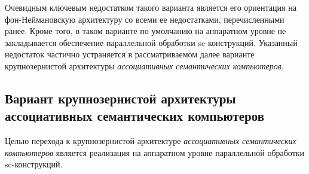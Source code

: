 Очевидным ключевым недостатком такого варианта является его ориентация на фон-Неймановскую архитектуру со всеми ее недостатками, перечисленными ранее. Кроме того, в таком варианте по умолчанию на аппаратном уровне не закладывается обеспечение параллельной обработки sc-конструкций. Указанный недостаток частично устраняется в рассматриваемом далее варианте крупнозернистой архитектуры \textit{ассоциативных семантических компьютеров}.

\subsection{Вариант крупнозернистой архитектуры ассоциативных семантических компьютеров}

Целью перехода к крупнозернистой архитектуре \textit{ассоциативных семантических компьютеров} является реализация на аппаратном уровне параллельной обработки sc-конструкций.

